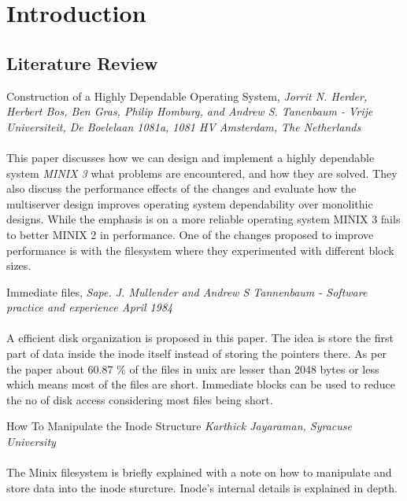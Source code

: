 \chapter{Introduction}

\section{Literature Review}

\vspace{10mm}
 Construction of a Highly Dependable Operating System, { \em Jorrit N. Herder, Herbert Bos, Ben Gras, Philip Homburg, and Andrew S. Tanenbaum - Vrije Universiteit, De Boelelaan 1081a, 1081 HV Amsterdam, The Netherlands
}\cite{chdos}
\\
\\
This paper discusses how we can design and implement a highly dependable system { \em MINIX 3} what problems are encountered, and how they are solved. They also discuss the performance effects of the changes and evaluate how the multiserver design improves operating system dependability over monolithic designs. While the emphasis is on a more reliable operating system MINIX 3 fails to better MINIX 2 in performance. One of the changes proposed to improve performance is with the filesystem where they experimented with different block sizes.

\vspace{10mm}

Immediate files, { \em  Sape. J. Mullender and Andrew S Tannenbaum - Software practice and experience April 1984 }\cite{astimme}
\\
\\
A efficient disk organization is proposed in this paper. The idea is store the first part of data inside the inode itself instead of storing the pointers there. As per the paper about 60.87 \% of the files in unix are lesser than 2048 bytes or less which means most of the files are short. Immediate blocks can be used to reduce the no of disk access considering most files being short.

\pagebreak
How To Manipulate the Inode Structure  { \em Karthick Jayaraman, Syracuse University } \cite{inode}
\\ 
\\
The Minix filesystem is briefly explained with a note on how to manipulate and store data into the inode sturcture. Inode's internal details is explained in depth.

\vspace{10mm}

